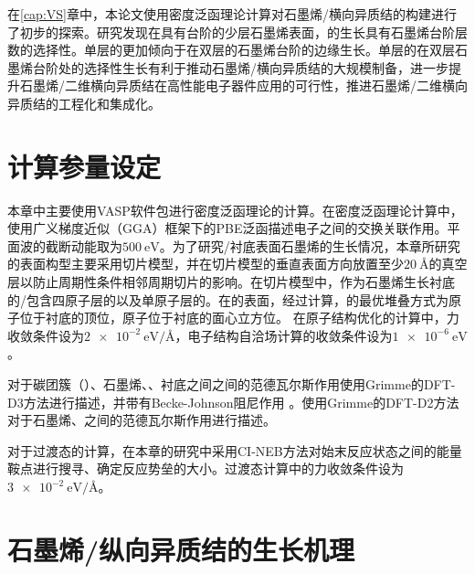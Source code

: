 在\ref{cap:VS}章中，本论文使用密度泛函理论计算对石墨烯/横向异质结的构建进行了初步的探索。研究发现在具有台阶的少层石墨烯表面，的生长具有石墨烯台阶层数的选择性。单层的更加倾向于在双层的石墨烯台阶的边缘生长。单层的在双层石墨烯台阶处的选择性生长有利于推动石墨烯/横向异质结的大规模制备，进一步提升石墨烯/二维横向异质结在高性能电子器件应用的可行性，推进石墨烯/二维横向异质结的工程化和集成化。

\section{计算参量设定}

本章中主要使用VASP软件包进行密度泛函理论的计算。在密度泛函理论计算中，使用广义梯度近似（GGA）框架下的PBE泛函描述电子之间的交换关联作用。平面波的截断动能取为$\SI{500}{\electronvolt}$。为了研究/衬底表面石墨烯的生长情况，本章所研究的表面构型主要采用切片模型，并在切片模型的垂直表面方向放置至少$\SI{20}{\angstrom}$的真空层以防止周期性条件相邻周期切片的影响。在切片模型中，作为石墨烯生长衬底的/包含四原子层的以及单原子层的。在的表面，经过计算，的最优堆叠方式为原子位于衬底的顶位，原子位于衬底的面心立方位。
在原子结构优化的计算中，力收敛条件设为$\SI{2e-2}{\electronvolt \per \angstrom}$，电子结构自洽场计算的收敛条件设为$\SI{1e-6}{\electronvolt}$。

对于碳团簇（）、石墨烯、、衬底之间之间的范德瓦尔斯作用使用Grimme的DFT-D3方法进行描述，并带有Becke-Johnson阻尼作用 。使用Grimme的DFT-D2方法对于石墨烯、之间的范德瓦尔斯作用进行描述。

对于过渡态的计算，在本章的研究中采用CI-NEB方法对始末反应状态之间的能量鞍点进行搜寻、确定反应势垒的大小。过渡态计算中的力收敛条件设为$\SI{3e-2}{\electronvolt \per \angstrom}$。

\section{石墨烯/纵向异质结的生长机理}
    \label{cap:CG}

